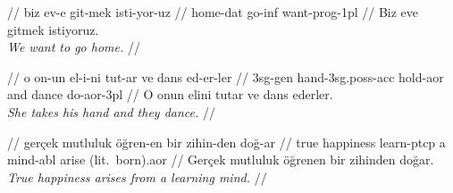 \documentclass{article}
\begin{document}
\ex
\begingl
\gla {}    //
\glb biz ev-e git-mek isti-yor-uz //
 home-{\sc dat} go-{\sc inf} want-{\sc prog}-{\sc 1pl} //
\glft Biz eve gitmek istiyoruz.\\\textit{We want to go home.} //
\endgl
\xe

\ex
\begingl
\gla {}       //
\glb o on-un el-i-ni tut-ar ve dans ed-er-ler //
 {\sc 3sg}-{\sc gen} hand-{\sc 3sg.poss}-{\sc acc} hold-{\sc aor} and dance do-{\sc aor}-{\sc 3pl} //
\glft O onun elini tutar ve dans ederler.\\\textit{She takes his hand and they dance.} //
\endgl
\xe

\ex
\begingl
\gla {}      //
\glb ger\c{c}ek mutluluk \"{o}\u{g}ren-en bir zihin-den do\u{g}-ar //
\glc true happiness learn-{\sc ptcp} a mind-{\sc abl} {arise (lit.\ born).{\sc aor}} //
\glft Gerçek mutluluk öğrenen bir zihinden doğar.\\\textit{True happiness arises from a learning mind.} //
\endgl
\xe
\end{document}
